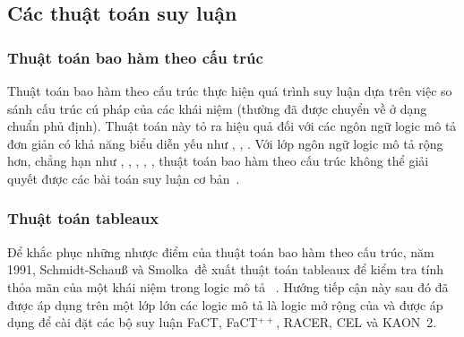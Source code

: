 \subsection{Các thuật toán suy luận}
\label{sec:Chap1.Algorithm}
\subsubsection{Thuật toán bao hàm theo cấu trúc}
\label{sec:Chap1.StructuralSubsumption}
Thuật toán bao hàm theo cấu trúc thực hiện quá trình suy luận dựa trên việc so sánh cấu trúc cú pháp của các khái niệm (thường đã được chuyển về ở dạng chuẩn phủ định). Thuật toán này tỏ ra hiệu quả đối với các ngôn ngữ logic mô tả đơn giản có khả năng biểu diễn yếu như \FLzero, \FLbot, \ALN. Với lớp ngôn ngữ logic mô tả rộng hơn, chẳng hạn như \ALC, \ALCI, \ALCIQ, \SHIQ, \SHOIQ, thuật toán bao hàm theo cấu trúc không thể giải quyết được các bài toán suy luận cơ bản~\cite{DLHandbook2007}.

\subsubsection{Thuật toán tableaux}
\label{sec:Chap1.Tableaux}
Để khắc phục những nhược điểm của thuật toán bao hàm theo cấu trúc, năm 1991, Schmidt-Schau{\ss} và Smolka~đề xuất thuật toán tableaux để kiểm tra tính thỏa mãn của một khái niệm trong logic mô tả \ALC~\cite{Schmidt1991}. Hướng tiếp cận này sau đó đã được áp dụng trên một lớp lớn các logic mô tả là logic mở rộng của \ALC và được áp dụng để cài đặt các bộ suy luận FaCT, FaCT$^{++}$, RACER, CEL và KAON~2.

%
\cleardoublepage